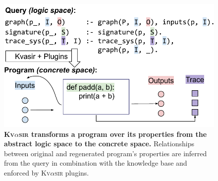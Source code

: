 \documentclass[nonacm,sigplan]{acmart}
\def\eg{{\em e.g.}, }
\newcommand{\sys}{{\scshape Kv{$\alpha$}sir}\xspace}
\newcommand{\heading}[1]{\vspace{2pt}\noindent\textbf{\emph{#1}}:\enspace}
\newcommand{\ttt}[1]{\texttt{#1}\xspace}
\begin{document}


\begin{figure}[t]
\centering
  \includegraphics[width=.9\columnwidth]{figs/kvasir_logic-space.pdf}
  \caption{\textbf{\sys transforms a program over its properties from the abstract logic space to the concrete space.}
  Relationships between original and regenerated program's properties are inferred 
  from the query in combination with the knowledge base and enforced by \sys plugins.
  }
  \label{fig:logic-to-concrete}
\end{figure}
\end{document}

